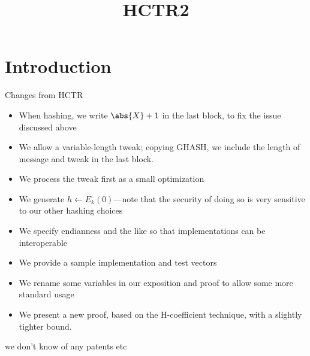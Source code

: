 \documentclass[letterpaper,11pt]{article}
\title{HCTR2}
\begin{document}
\maketitle

\begin{abstract}
\end{abstract}

\section{Introduction}
Changes from HCTR
\begin{itemize}
    \item When hashing, we write \(\abs{X} + 1\) in the last block, to fix the issue discussed above
    \item We allow a variable-length tweak; copying GHASH\cite{gcm}, 
    we include the length of message and tweak in the last block. 
    \item We process the tweak first as a small optimization
    \item We generate \(h \gets E_k(0)\)---note that the security of doing so is very sensitive to our other hashing choices
    \item We specify endianness and the like so that implementations can be interoperable
    \item We provide a sample implementation and test vectors
    \item We rename some variables in our exposition and proof to allow some more standard usage
    \item We present a new proof, based on the H-coefficient technique, with a slightly tighter bound.
\end{itemize}

we don't know of any patents etc
\end{document}
